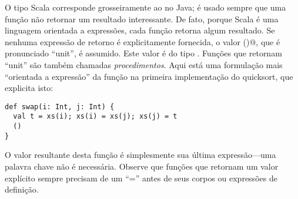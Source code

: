 O tipo Scala \lstinline@Unit@ corresponde grosseiramente ao \lstinline@void@
no Java; \'{e} usado sempre que uma fun\c{c}\~{a}o n\~{a}o retornar um resultado interessante.
De fato, porque Scala \'{e} uma linguagem orientada a express\~{o}es, cada fun\c{c}\~{a}o 
retorna algum resultado. Se nenhuma express\~{a}o de retorno \'{e}  explicitamente
fornecida, o valor \lstinline@()@, que \'{e} pronunciado ``unit'', \'{e} assumido.
Este valor \'{e} do tipo \lstinline@Unit@. Fun\c{c}\~{o}es que retornam ``unit'' s\~{a}o 
tamb\'{e}m chamadas {\em procedimentos}. Aqui est\'{a} uma formula\c{c}\~{a}o mais 
``orientada a express\~{a}o'' da fun\c{c}\~{a}o \lstinline@swap@ na primeira implementa\c{c}\~{a}o
do quicksort, que explicita isto:

\begin{lstlisting}
def swap(i: Int, j: Int) {
  val t = xs(i); xs(i) = xs(j); xs(j) = t
  ()
}
\end{lstlisting}

O valor resultante desta fun\c{c}\~{a}o \'{e} simplesmente sua \'{u}ltima express\~{a}o---uma
palavra chave \lstinline@return@ n\~{a}o \'{e} necess\'{a}ria. Observe que fun\c{c}\~{o}es 
que retornam um valor expl\'{i}cito sempre precisam de um ``='' antes de
seus corpos ou express\~{o}es de defini\c{c}\~{a}o.

